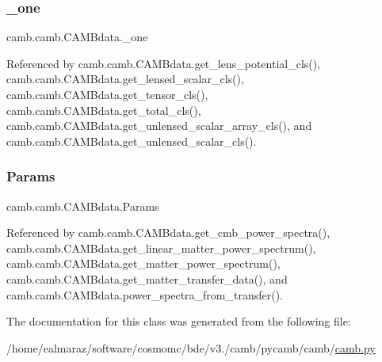 \mbox{\label{classcamb_1_1camb_1_1CAMBdata_ac2189ee12baa3a5b6efc08fe4628ecfc}} 
\subsubsection{\texorpdfstring{\+\_\+one}{\_one}}
{\footnotesize\ttfamily camb.\+camb.\+C\+A\+M\+Bdata.\+\_\+one\hspace{0.3cm}{\ttfamily [private]}}



Referenced by camb.\+camb.\+C\+A\+M\+Bdata.\+get\+\_\+lens\+\_\+potential\+\_\+cls(), camb.\+camb.\+C\+A\+M\+Bdata.\+get\+\_\+lensed\+\_\+scalar\+\_\+cls(), camb.\+camb.\+C\+A\+M\+Bdata.\+get\+\_\+tensor\+\_\+cls(), camb.\+camb.\+C\+A\+M\+Bdata.\+get\+\_\+total\+\_\+cls(), camb.\+camb.\+C\+A\+M\+Bdata.\+get\+\_\+unlensed\+\_\+scalar\+\_\+array\+\_\+cls(), and camb.\+camb.\+C\+A\+M\+Bdata.\+get\+\_\+unlensed\+\_\+scalar\+\_\+cls().

\mbox{\label{classcamb_1_1camb_1_1CAMBdata_ab333dd987280e2ea9de0bf1d2d42eb5d}} 
\subsubsection{\texorpdfstring{Params}{Params}}
{\footnotesize\ttfamily camb.\+camb.\+C\+A\+M\+Bdata.\+Params}



Referenced by camb.\+camb.\+C\+A\+M\+Bdata.\+get\+\_\+cmb\+\_\+power\+\_\+spectra(), camb.\+camb.\+C\+A\+M\+Bdata.\+get\+\_\+linear\+\_\+matter\+\_\+power\+\_\+spectrum(), camb.\+camb.\+C\+A\+M\+Bdata.\+get\+\_\+matter\+\_\+power\+\_\+spectrum(), camb.\+camb.\+C\+A\+M\+Bdata.\+get\+\_\+matter\+\_\+transfer\+\_\+data(), and camb.\+camb.\+C\+A\+M\+Bdata.\+power\+\_\+spectra\+\_\+from\+\_\+transfer().



The documentation for this class was generated from the following file\+:\begin{DoxyCompactItemize}
\item 
/home/ealmaraz/software/cosmomc/bde/v3./camb/pycamb/camb/\mbox{\hyperlink{camb_8py}{camb.\+py}}\end{DoxyCompactItemize}
